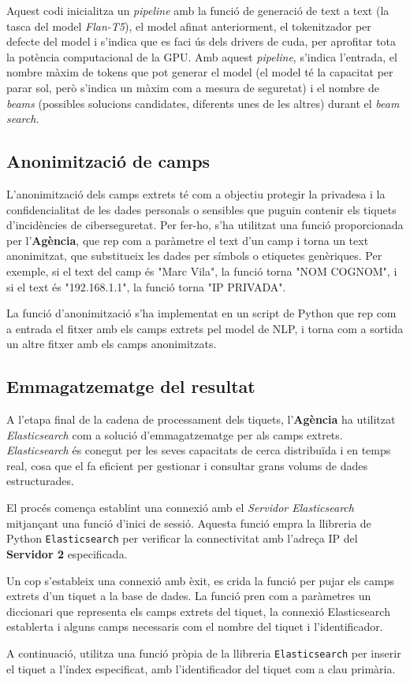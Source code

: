 Aquest codi inicialitza un \textit{pipeline} amb la funció de generació de text a text (la tasca del model \textit{Flan-T5}), el model afinat anteriorment, el tokenitzador per defecte del model i s'indica que es faci ús dels drivers de cuda, per aprofitar tota la potència computacional de la GPU. Amb aquest \textit{pipeline}, s'indica l'entrada, el nombre màxim de tokens que pot generar el model (el model té la capacitat per parar sol, però s'indica un màxim com a mesura de seguretat) i el nombre de \textit{beams} (possibles solucions candidates, diferents unes de les altres) durant el \textit{beam search}.


\subsection{Anonimització de camps}
L'anonimització dels camps extrets té com a objectiu protegir la privadesa i la confidencialitat de les dades personals o sensibles que puguin contenir els tiquets d'incidències de ciberseguretat. Per fer-ho, s'ha utilitzat una funció proporcionada per l'\textbf{Agència}, que rep com a paràmetre el text d'un camp i torna un text anonimitzat, que substitueix les dades per símbols o etiquetes genèriques. Per exemple, si el text del camp és "Marc Vila", la funció torna "NOM COGNOM", i si el text és "192.168.1.1", la funció torna "IP PRIVADA".

La funció d'anonimització s'ha implementat en un script de Python que rep com a entrada el fitxer amb els camps extrets pel model de NLP, i torna com a sortida un altre fitxer amb els camps anonimitzats.


\subsection{Emmagatzematge del resultat}
A l'etapa final de la cadena de processament dels tiquets, l'\textbf{Agència} ha utilitzat \textit{Elasticsearch} com a solució d'emmagatzematge per als camps extrets. \textit{Elasticsearch} és conegut per les seves capacitats de cerca distribuïda i en temps real, cosa que el fa eficient per gestionar i consultar grans volums de dades estructurades.

El procés comença establint una connexió amb el \textit{Servidor Elasticsearch} mitjançant una funció d'inici de sessió. Aquesta funció empra la llibreria de Python \texttt{Elasticsearch} per verificar la connectivitat amb l'adreça IP del \textbf{Servidor 2} especificada.

Un cop s'estableix una connexió amb èxit, es crida la funció per pujar els camps extrets d'un tiquet a la base de dades. La funció pren com a paràmetres un diccionari que representa els camps extrets del tiquet, la connexió Elasticsearch establerta i alguns camps necessaris com el nombre del tiquet i l'identificador.

A continuació, utilitza una funció pròpia de la llibreria \texttt{Elasticsearch} per inserir el tiquet a l'índex especificat, amb l'identificador del tiquet com a clau primària.
